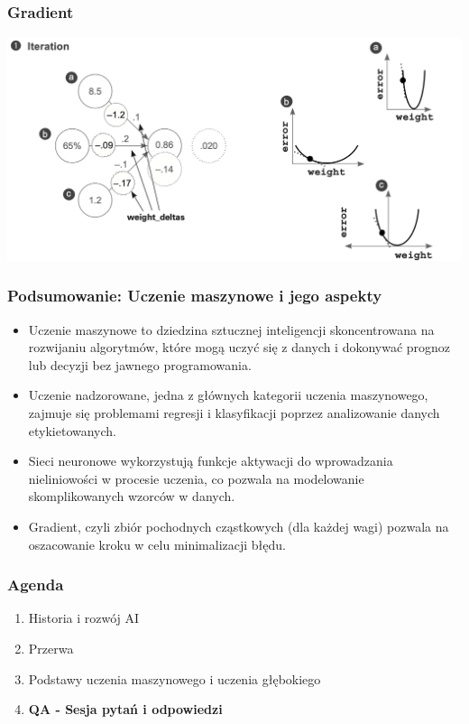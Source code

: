 \documentclass[smaller]{beamer}
\begin{document}
\begin{frame}
\frametitle{Gradient}
    \centering
    \includegraphics[width=\textwidth,height=0.8\textheight,keepaspectratio]{../manifest/grad.png}
\end{frame}


\begin{frame}
\frametitle{Podsumowanie: Uczenie maszynowe i jego aspekty}

\begin{itemize}
    \item Uczenie maszynowe to dziedzina sztucznej inteligencji skoncentrowana na rozwijaniu algorytmów, które mogą uczyć się z danych i dokonywać prognoz lub decyzji bez jawnego programowania.
    \item Uczenie nadzorowane, jedna z głównych kategorii uczenia maszynowego, zajmuje się problemami regresji i klasyfikacji poprzez analizowanie danych etykietowanych.
    \item Sieci neuronowe wykorzystują funkcje aktywacji do wprowadzania nieliniowości w procesie uczenia, co pozwala na modelowanie skomplikowanych wzorców w danych.
    \item Gradient, czyli zbiór pochodnych cząstkowych (dla każdej wagi) pozwala na oszacowanie kroku w celu minimalizacji błędu.
\end{itemize}

\end{frame}


\begin{frame}
\frametitle{Agenda}
\begin{enumerate}
    \item \color{gray}Historia i rozwój AI
    \item \color{gray}Przerwa
    \item \color{gray}Podstawy uczenia maszynowego i uczenia głębokiego
    \item \textbf{\color{black}QA - Sesja pytań i odpowiedzi}
\end{enumerate}
\end{frame}
\end{document}
